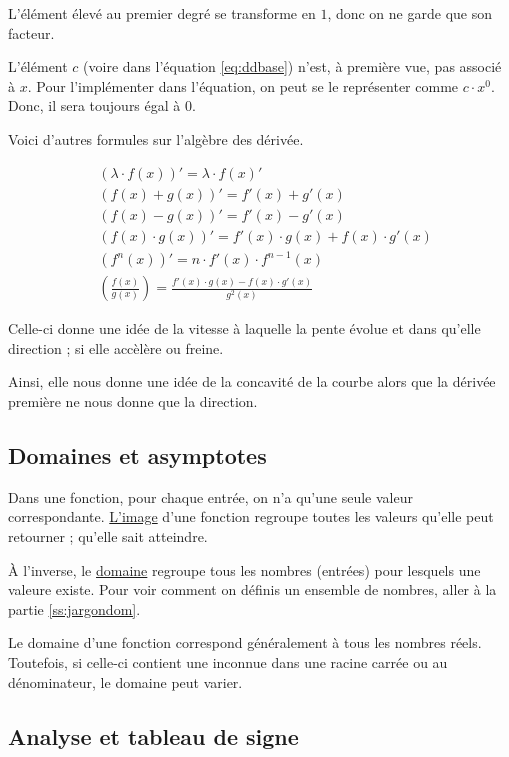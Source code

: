 \documentclass[a4paper]{article}
\begin{document}
    L'élément élevé au premier degré se transforme en $1$, donc on ne garde que
    son facteur.

    L'élément $c$ (voire dans l'équation \ref{eq:ddbase}) n'est, à première vue,
    pas associé à $x$. Pour l'implémenter dans l'équation, on peut se le
    représenter comme $c \cdot x^0$. Donc, il sera toujours égal à 0.

    Voici d'autres formules sur l'algèbre des dérivée. 

    \begin{align}
        &(\lambda \cdot f(x))' = \lambda \cdot f(x)' \label{eq:de1}\\
        &(f(x) + g(x))' = f'(x) + g'(x) \label{eq:de2}\\
        &(f(x) - g(x))' = f'(x) - g'(x) \label{eq:de3}\\
        &(f(x) \cdot g(x))' =  f'(x) \cdot g(x) +  f(x) \cdot g'(x)
        \label{eq:de4}\\
        &(f^n(x))' = n \cdot f'(x) \cdot f^{n-1}(x) \label{eq:de5}\\
        &(\frac{f(x)}{g(x)})= \frac{f'(x) \cdot g(x) - f(x) \cdot g'(x)}{g^2(x)}
        \label{eq:de6}
    \end{align}


    Celle-ci donne une idée de la vitesse à laquelle la pente évolue et dans
    qu'elle direction ; si elle accèlère ou freine.

    Ainsi, elle nous donne une idée de la concavité de la courbe alors que
    la dérivée première ne nous donne que la direction.
    
    \subsection{Domaines et asymptotes}
    Dans une fonction, pour chaque entrée, on n'a qu'une seule valeur
    correspondante. \underline{L'image} d'une fonction regroupe toutes les
    valeurs qu'elle peut retourner ; qu'elle sait atteindre.

    À l'inverse, le \underline{domaine} regroupe tous les nombres (entrées) pour
    lesquels une valeure existe. Pour voir comment on définis un ensemble de
    nombres, aller à la partie \ref{ss:jargondom}.

    Le domaine d'une fonction correspond généralement à tous les nombres réels.
    Toutefois, si celle-ci contient une inconnue dans une racine carrée ou au
    dénominateur, le domaine peut varier.


    \subsection{Analyse et tableau de signe}
\end{document}
